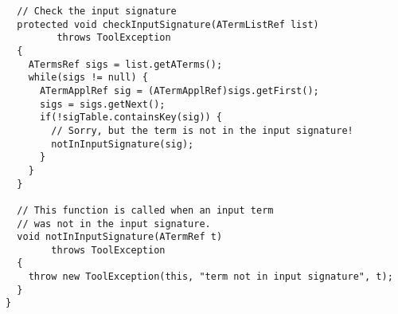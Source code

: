 \begin{verbatim}
  // Check the input signature
  protected void checkInputSignature(ATermListRef list)
         throws ToolException
  {
    ATermsRef sigs = list.getATerms();
    while(sigs != null) {
      ATermApplRef sig = (ATermApplRef)sigs.getFirst();
      sigs = sigs.getNext();
      if(!sigTable.containsKey(sig)) {
        // Sorry, but the term is not in the input signature!
        notInInputSignature(sig);
      }
    }
  }

  // This function is called when an input term
  // was not in the input signature.
  void notInInputSignature(ATermRef t)
        throws ToolException
  {
    throw new ToolException(this, "term not in input signature", t);
  }
}

\end{verbatim}
